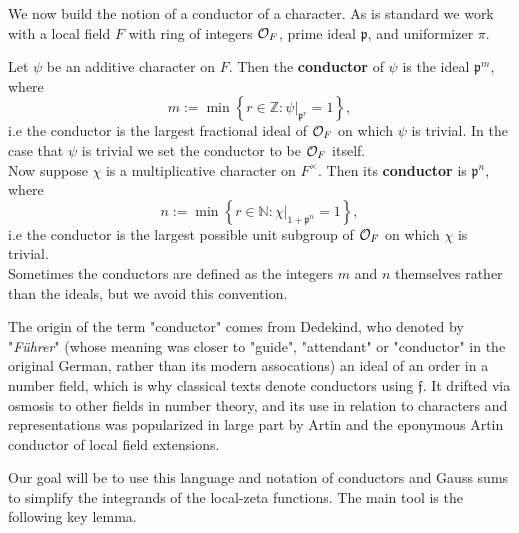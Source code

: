 \documentclass[11pt, x11names]{book}
\newcommand{\nn}{\mathbb{N}}
\newcommand{\zz}{\mathbb{Z}}
\newcommand{\pp}{\mathfrak{p}}
\newcommand{\frakf}{\mathfrak{f}}
\newcommand{\set}[1]{\left\{ #1 \right\}}
\begin{document}
We now build the notion of a conductor of a character. As is standard we work with a local field $F$ with ring of integers $\mathcal{O}_F$, prime ideal $\pp$, and  uniformizer $\pi$.
\begin{defn}
\label{def: conductor}
Let $\psi$ be an additive character on $F$. Then the \textbf{conductor} of $\psi$ is the ideal $\pp^m$, where 
\begin{equation*}
    m := \min \set{r \in \zz : \psi \vert_{\pp^r} = 1},
\end{equation*}
i.e the conductor is the largest fractional ideal of $\mathcal{O}_F$ on which $\psi$ is trivial. In the case that $\psi$ is trivial we set the conductor to be $\mathcal{O}_F$ itself.\\
Now suppose $\chi$ is a multiplicative character on $F^\times$. Then its \textbf{conductor} is $\pp^n$, where
\begin{equation*}
    n := \min \set{r \in \nn : \chi \vert_{1 + \pp^n} = 1},
\end{equation*}
i.e the conductor is the largest possible unit subgroup of $\mathcal{O}_F$ on which $\chi$ is trivial.\\
Sometimes the conductors are defined as the integers $m$ and $n$ themselves rather than the ideals, but we avoid this convention.
\end{defn}
\begin{remark}[Terminology]
    The origin of the term "conductor" comes from Dedekind, who denoted by "\textit{F\"uhrer}" (whose meaning was closer to "guide", "attendant" or "conductor" in the original German, rather than its modern assocations) an ideal of an order in a number field, which is why classical texts denote conductors using $\frakf$. It drifted via osmosis to other fields in number theory, and its use in relation to characters and representations was popularized in large part by Artin and the eponymous Artin conductor of local field extensions.
\end{remark}

Our goal will be to use this language and notation of conductors and Gauss sums to simplify the integrands of the local-zeta functions. The main tool is the following key lemma.
\end{document}
